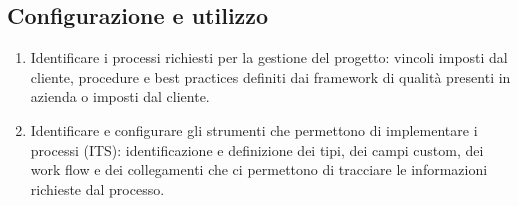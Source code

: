 \documentclass[10pt, a4paper]{article}
\begin{document}
\subsection{Configurazione e utilizzo}
\begin{enumerate}
\item Identificare i processi richiesti per la gestione del progetto: vincoli imposti dal cliente, procedure e best practices definiti dai framework di qualità presenti in azienda o imposti dal cliente.
\item Identificare e configurare gli strumenti che permettono di implementare i processi (ITS): identificazione e definizione dei tipi, dei campi custom, dei work flow e dei collegamenti che ci permettono di tracciare le informazioni richieste dal processo.
\end{enumerate}
\end{document}
